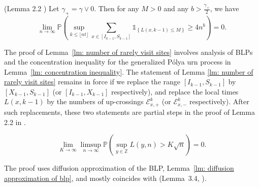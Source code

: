 \documentclass[EJP]{ejpecp} %
\begin{document}
\begin{lemma}(Lemma 2.2 \cite{KMP23})\label{lm: number of rarely visit sites}
	Let $\gamma_+ = \gamma \vee 0$. Then for any $M>0$ and any $b>\frac{\gamma_+}{2}$, we have
	\[
	\lim_{n\to\infty} \mathbb{P}\left(\sup_{k\leq\lfloor nt \rfloor}  \sum_{x\in [I_{k-1}, S_{k-1}]} \mathbb{1}_{\left\{ L(x,k-1) \leq M \right\}} \geq 4n^b \right) = 0.
	\]
	
\end{lemma}	
The proof of Lemma~\ref{lm: number of rarely visit sites} involves analysis of BLPs and the concentration inequality for the generalized P\'{o}lya urn process in Lemma~\ref{lm: concentration inequality}. The statement of Lemma \ref{lm: number of rarely visit sites} remains in force if we replace the range $[I_{k-1}, S_{k-1}]$ by $[X_{k - 1},S_{k - 1}]$ (or $[I_{k-1},X_{k - 1}]$ respectively), and replace the local times $L(x,k-1)$ by the numbers of up-crossings $\mathcal{E}^{k}_{x,+}$ (or $\mathcal{E}^{k}_{x,-}$ respectively). After such replacements, these two statements are partial steps in the proof of Lemma 2.2 in \cite{KMP23}.   

\begin{lemma}
	\label{lm: uniform control of local time}
	\[
	\lim_{K \to  \infty } \limsup_{n \to \infty } \mathbb{P}\left( \sup_{y \in \mathbb{Z}} L\left( y, n \right) > K \sqrt{n}  \right) = 0
	.\] 
\end{lemma}
The proof uses diffusion approximation of the BLP, Lemma~\ref{lm: diffusion approximation of blp}, and mostly coincides with (Lemma~3.4, \cite{KP16}). 
\end{document}
